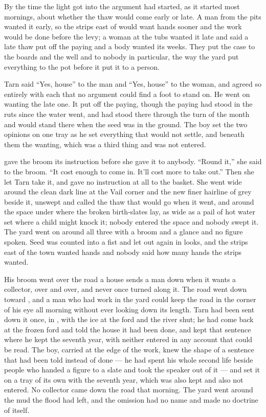 \scenebreak

By the time the light got into  the argument had started, as it started most mornings, about whether the thaw would come early or late. A man from the pits wanted it early, so the strips east of  would want hands sooner and the work would be done before the levy; a woman at the tubs wanted it late and said a late thaw put off the paying and a body wanted its weeks. They put the case to the boards and the well and to nobody in particular, the way the yard put everything to the pot before it put it to a person.

Tarn said “Yes, house” to the man and “Yes, house” to the woman, and agreed so entirely with each that no argument could find a foot to stand on. He went on wanting the late one. It put off the paying, though the paying had stood in the ruts since the water went, and had stood there through the turn of the month and would stand there when the seed was in the ground. The boy set the two opinions on one tray as he set everything that would not settle, and beneath them the wanting, which was a third thing and was not entered.

 gave the broom its instruction before she gave it to anybody. “Round it,” she said to the broom. “It cost enough to come in. It’ll cost more to take out.” Then she let Tarn take it, and gave no instruction at all to the basket. She went wide around the clean dark line at the Vail corner and the new finer hairline of grey beside it, unswept and called the thaw that would go when it went, and around the space under  where the broken birth-slates lay, as wide as a pail of hot water set where a child might knock it; nobody entered the space and nobody swept it. The yard went on around all three with a broom and a glance and no figure spoken. Seed was counted into a fist and let out again in looks, and the strips east of the town wanted hands and nobody said how many hands the strips wanted.

His broom went over the road a house sends a man down when it wants a collector, over and over, and never once turned along it. The road went down toward , and a man who had work in the yard could keep the road in the corner of his eye all morning without ever looking down its length. Tarn had been sent down it once, in , with the ice at the ford and the river shut; he had come back at the frozen ford and told the house it had been done, and kept that sentence where he kept the seventh year, with neither entered in any account that could be read. The boy, carried at the edge of the work, knew the shape of a sentence that had been told instead of done --- he had spent his whole second life beside people who handed a figure to a slate and took the speaker out of it --- and set it on a tray of its own with the seventh year, which was also kept and also not entered. No collector came down the road that morning. The yard went around the mud the flood had left, and the omission had no name and made no doctrine of itself.

